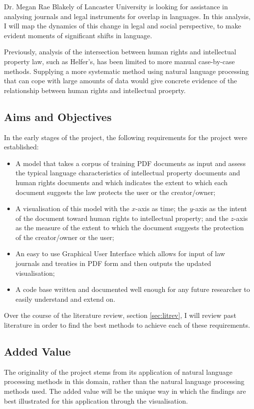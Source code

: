 			Dr. Megan Rae Blakely of Lancaster University is looking for assistance in analysing journals and legal instruments for overlap in languages. In this analysis, I will map the dynamics of this change in legal and social perspective, to make evident moments of significant shifts in language. 
			
			Previously, analysis of the intersection between human rights and intellectual property law, such as Helfer's\cite{hr_ip_conflict_coexistence_helfer}, has been limited to more manual case-by-case methods. Supplying a more systematic method using natural language processing that can cope with large amounts of data would give concrete evidence of the relationship between human rights and intellectual proeprty. 
		\subsection{Aims and Objectives}
			In the early stages of the project, the following requirements for the project were established:
			\begin{itemize}
				\item A model that takes a corpus of training PDF documents as input and assess the typical language characteristics of intellectual property documents and human rights documents and which indicates the extent to which each document suggests the law protects the user or the creator/owner;
				\item A visualisation of this model with the $x$-axis as time; the $y$-axis as the intent of the document toward human rights to intellectual property; and the $z$-axis as the measure of the extent to which the document suggests the protection of the creator/owner or the user;
				\item An easy to use Graphical User Interface which allows for input of law journals and treaties in PDF form and then outputs the updated visualisation;
				\item A code base written and documented well enough for any future researcher to easily understand and extend on.
			\end{itemize}
			
			Over the course of the literature review, section \ref{sec:litrev}, I will review past literature in order to find the best methods to achieve each of these requirements.
		\subsection{Added Value}
			The originality of the project stems from its application of natural language processing methods in this domain, rather than the natural language processing methods used. The added value will be the unique way in which the findings are best illustrated for this application through the visualisation.
			
